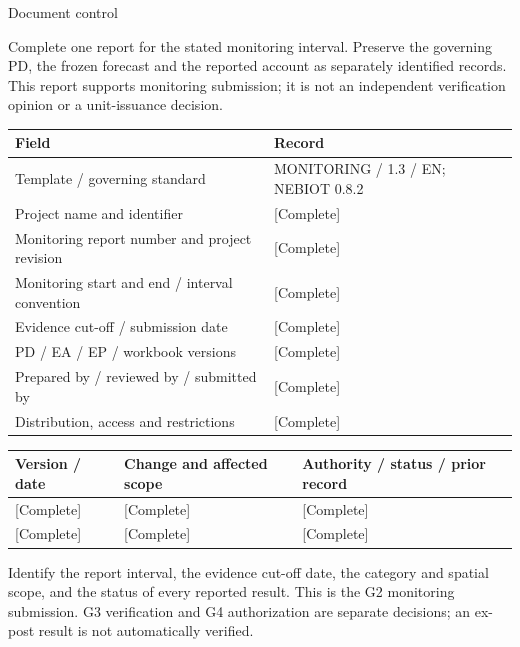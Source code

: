 \clearpage
{\fontsize{23}{27}\selectfont\color{NEBGreen}Document control\par}
\begin{Notice}Complete one report for the stated monitoring interval. Preserve the governing PD, the frozen forecast and the reported account as separately identified records. This report supports monitoring submission; it is not an independent verification opinion or a unit-issuance decision.\end{Notice}
{\sffamily\fontsize{8.6}{10.7}\selectfont\begin{longtable}{@{}P{82mm}P{82mm}@{}}
\toprule
\textbf{Field} & \textbf{Record}\\\midrule\endhead
\rule{0pt}{8mm}Template / governing standard & MONITORING / 1.3 / EN; NEBIOT 0.8.2\\\hline
\rule{0pt}{8mm}Project name and identifier & [Complete]\\\hline
\rule{0pt}{8mm}Monitoring report number and project revision & [Complete]\\\hline
\rule{0pt}{8mm}Monitoring start and end / interval convention & [Complete]\\\hline
\rule{0pt}{8mm}Evidence cut-off / submission date & [Complete]\\\hline
\rule{0pt}{8mm}PD / EA / EP / workbook versions & [Complete]\\\hline
\rule{0pt}{8mm}Prepared by / reviewed by / submitted by & [Complete]\\\hline
\rule{0pt}{8mm}Distribution, access and restrictions & [Complete]\\\hline
\end{longtable}}
{\sffamily\fontsize{8.6}{10.7}\selectfont\begin{longtable}{@{}P{48mm}P{61mm}P{53mm}@{}}
\toprule
\textbf{Version / date} & \textbf{Change and affected scope} & \textbf{Authority / status / prior record}\\\midrule\endhead
\rule{0pt}{8mm}[Complete] & [Complete] & [Complete]\\\hline
\rule{0pt}{8mm}[Complete] & [Complete] & [Complete]\\\hline
\end{longtable}}
\clearpage
\tableofcontents
{}
Identify the report interval, the evidence cut-off date, the category and spatial scope, and the status of every reported result. This is the G2 monitoring submission. G3 verification and G4 authorization are separate decisions; an ex-post result is not automatically verified.\par

